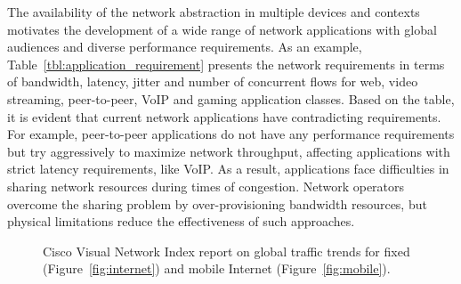 The availability of the network abstraction in multiple devices and contexts
motivates the development of a wide range of network applications with global
audiences and diverse performance requirements.  As an example,
Table~\ref{tbl:application_requirement} presents the network requirements in
terms of bandwidth, latency, jitter and number of concurrent flows for web,
video streaming, peer-to-peer,  VoIP and gaming application classes.  Based on
the table, it is evident that current network applications have contradicting
requirements. For example, peer-to-peer applications do not have any
performance requirements but try aggressively to maximize network throughput,
affecting applications with strict latency requirements, like VoIP\@.  As a
result, applications face difficulties in sharing network resources during
times of congestion. Network operators overcome the sharing problem by
over-provisioning bandwidth resources, but physical limitations reduce the
effectiveness of such approaches.

\begin{figure}[] 
  \caption[Cisco Visual Network Index report on global traffic trends]{Cisco
    Visual Network Index report on global traffic trends
    for fixed (Figure~\ref{fig:internet}) and mobile Internet (Figure~\ref{fig:mobile}).}
  \label{fig:internet_applications} 
\end{figure}

